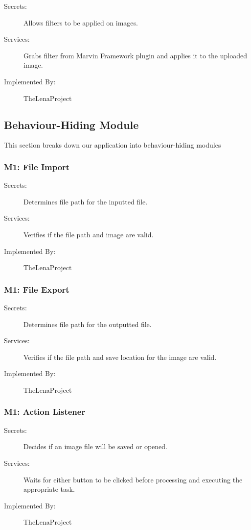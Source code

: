 \documentclass[12pt, titlepage]{article}
\begin{document}
\begin{description}
	\item[Secrets:] Allows filters to be applied on images.
	\item[Services:] Grabs filter from Marvin Framework plugin and applies it to the uploaded image.
	\item[Implemented By:] TheLenaProject
\end{description}

\subsection{Behaviour-Hiding Module}
This section breaks down our application into behaviour-hiding modules
\subsubsection{M1: File Import}

\begin{description}
	\item[Secrets:] Determines file path for the inputted file.
	\item[Services:] Verifies if the file path and image are valid.
	\item[Implemented By:] TheLenaProject
\end{description}

\subsubsection{M1: File Export}

\begin{description}
	\item[Secrets:] Determines file path for the outputted file.
	\item[Services:] Verifies if the file path and save location for the image are valid.
	\item[Implemented By:] TheLenaProject
\end{description}

\subsubsection{M1: Action Listener}

\begin{description}
	\item[Secrets:] Decides if an image file will be saved or opened.
	\item[Services:] Waits for either button to be clicked before processing and executing the appropriate task. 
	\item[Implemented By:] TheLenaProject
\end{description}
\end{document}

